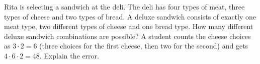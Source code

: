 Rita is selecting a sandwich at the deli. The deli has four types of meat, three types of cheese and two types of bread. A deluxe sandwich consists of exactly one meat type, two different types of cheese and one bread type. How many different deluxe sandwich combinations are possible? A student counts the cheese choices as $3\cdot2=6$ (three choices for the first cheese, then two for the second) and gets $4\cdot6\cdot2=48$. Explain the error.
